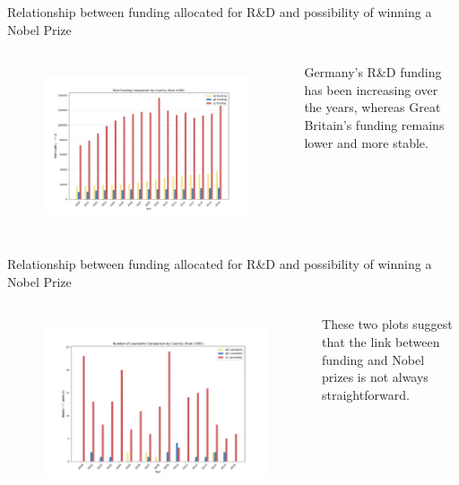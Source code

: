 \documentclass[aspectratio=169,xcolor=dvipsnames]{beamer}
\begin{document}
\begin{frame}{Relationship between funding allocated for R\&D and possibility of winning a Nobel Prize}
	\vspace{-1em}
	\begin{columns}[c]
		\begin{figure}[H]
			\centering
			\includegraphics[width=\textwidth]{../queries/plots/funding_comparison_by_country.png}
			\label{fig:fundings_per_country}
		\end{figure}
		Germany's R\&D funding has been increasing over the years, whereas
		Great Britain's funding remains lower and more stable.
	\end{columns}
\end{frame}

\begin{frame}{Relationship between funding allocated for R\&D and possibility of winning a Nobel Prize}
	\vspace{-1em}
	\begin{columns}[c]
		\begin{figure}[H]
			\centering
			\includegraphics[width=\textwidth]{../queries/plots/laureates_comparison_by_country.png}
			\label{fig:laureates_per_country}
		\end{figure}
		These two plots suggest that the link between funding and Nobel prizes is not always
		straightforward.
	\end{columns}
\end{frame}
\end{document}
